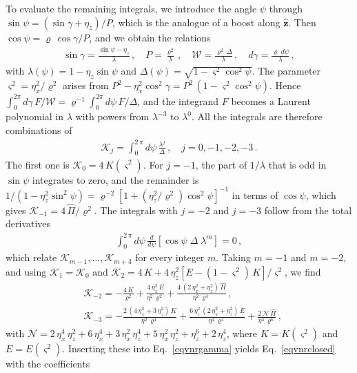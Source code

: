 \documentclass[aps,prb,onecolumn,nofootinbib,citeautoscript,10pt]{revtex4-2}
\newcommand{\bs}[1]{\boldsymbol{#1}}
\def \nn{\nonumber \\}
\begin{document}
To evaluate the remaining integrals, we introduce the angle $\psi$ through $\sin\psi=(\sin\gamma+\eta_z)/P$, which is the analogue of a boost along $\hat{\bs z}$. Then $\cos\psi=\varrho\,\cos\gamma/P$, and we obtain the relations
\begin{align}
\sin\gamma=\frac{\sin\psi-\eta_z}{\lambda}\,, \quad P=\frac{\varrho^2}{\lambda}\,, \quad \mathcal W=\frac{\varrho^2\,\Delta}{\lambda}\,, \quad d\gamma=\frac{\varrho\;d\psi}{\lambda}\,,
\end{align}
with $\lambda(\psi)=1-\eta_z\sin\psi$ and $\Delta(\psi)=\sqrt{1-\varsigma^2\cos^2\psi}$. The parameter $\varsigma^2=\eta_x^2/\varrho^2$ arises from $P^2-\eta_x^2\cos^2\gamma=P^2\,(1-\varsigma^2\cos^2\psi)$. Hence $\int_0^{2\pi}d\gamma\,F/\mathcal W=\varrho^{-1}\int_0^{2\pi}d\psi\,F/\Delta$, and the integrand $F$ becomes a Laurent polynomial in $\lambda$ with powers from $\lambda^{-3}$ to $\lambda^0$. All the integrals are therefore combinations of
\begin{align}
\mathcal K_j=\int_0^{2\,\pi}d\psi\,\frac{\lambda^j}{\Delta}\,, \quad j=0,-1,-2,-3\,.
\end{align}
The first one is $\mathcal K_0=4\,K(\varsigma^2)$. For $j=-1$, the part of $1/\lambda$ that is odd in $\sin\psi$ integrates to zero, and the remainder is $1/(1-\eta_z^2\sin^2\psi)=\varrho^{-2}\left[1+(\eta_z^2/\varrho^2)\cos^2\psi\right]^{-1}$ in terms of $\cos\psi$, which gives $\mathcal K_{-1}=4\,\hat\Pi/\varrho^2$. The integrals with $j=-2$ and $j=-3$ follow from the total derivatives
\begin{align}
\int_0^{2\,\pi}d\psi\,\frac{d}{d\psi}\left[\cos\psi\;\Delta\;\lambda^m\right]=0\,,
\end{align}
which relate $\mathcal K_{m-1},\dots,\mathcal K_{m+3}$ for every integer $m$. Taking $m=-1$ and $m=-2$, and using $\mathcal K_1=\mathcal K_0$ and $\mathcal K_2=4\,K+4\,\eta_z^2\left[E-(1-\varsigma^2)\,K\right]/\varsigma^2$, we find
\begin{align}
& \mathcal K_{-2}=-\frac{4\,K}{\varrho^2}+\frac{4\,\eta_z^2\,E}{\eta^2\,\varrho^2}+\frac{4\,(2\,\eta_x^2+\eta_z^2)\,\hat\Pi}{\eta^2\,\varrho^4}\,, \nn &
\mathcal K_{-3}=-\frac{2\,(4\,\eta_x^2+3\,\eta_z^2)\,K}{\eta^2\,\varrho^4}+\frac{6\,\eta_z^2\,(2\,\eta_x^2+\eta_z^2)\,E}{\eta^4\,\varrho^4}+\frac{2\,\mathcal N\,\hat\Pi}{\eta^4\,\varrho^6}\,,
\end{align}
with $\mathcal N=2\,\eta_x^4\,\eta_z^2+6\,\eta_x^4+3\,\eta_x^2\,\eta_z^4+5\,\eta_x^2\,\eta_z^2+\eta_z^6+2\,\eta_z^4$, where $K=K(\varsigma^2)$ and $E=E(\varsigma^2)$. Inserting these into Eq.~\eqref{eqvnrgamma} yields Eq.~\eqref{eqvnrclosed} with the coefficients
\end{document}
